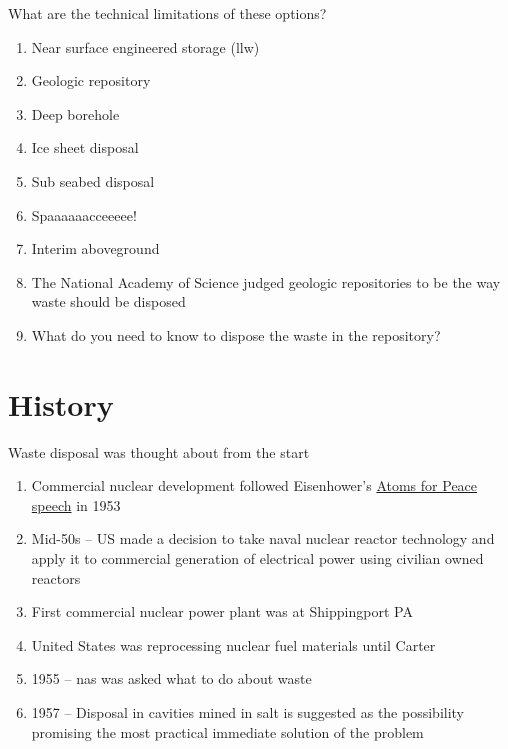 \documentclass[aspectratio=1610,pdftex,dvipsnames,compress,xcolor={dvipsnames}]{beamer}
\newcommand{\acf}{\acrfull} %
\newcommand{\acs}{\acrshort} %
\begin{document}
\addtocounter{framenumber}{-1} 
\begin{frame}{What are the technical limitations of these options?}
    \begin{enumerate}[series=outerlist,topsep=0pt,itemsep=11pt,leftmargin=*,label=(\arabic*)]
        \item[]Near surface engineered storage (\acs{llw})
        \item[]Geologic repository 
        \item[]Deep borehole
        \item[]Ice sheet disposal
        \item[]Sub seabed disposal
        \item[]Spaaaaaacceeeee!
        \item[]Interim aboveground
        \item[]The National Academy of Science judged geologic repositories to be the way waste should be disposed
        \item[]What do you need to know to dispose the waste in the repository?
    \end{enumerate}
\end{frame}


\section{History}


\addtocounter{framenumber}{-1} 
\begin{frame}{Waste disposal was thought about from the start}
    \begin{enumerate}[series=outerlist,topsep=0pt,itemsep=21pt,leftmargin=*,label=(\arabic*)]
        \item[]Commercial nuclear development followed Eisenhower's \href{https://youtu.be/2B8R-umE0s0}{Atoms for Peace speech} in 1953
        \item[]Mid-50s -- US made a decision to take naval nuclear reactor technology and apply it to commercial generation of electrical power using civilian owned reactors
        \item[]First commercial nuclear power plant was at Shippingport PA  
        \item[]United States was reprocessing nuclear fuel materials until Carter
        \item[]1955 -- \acf{nas} was asked what to do about waste 
        \item[]1957 -- Disposal in cavities mined in salt is suggested as the possibility promising the most practical immediate solution of the problem
    \end{enumerate}
\end{frame}
\end{document}
